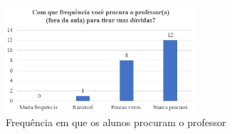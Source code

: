 \begin{figure}[htb]	
\center%
\includegraphics[width=7cm]{./img/frequencia_professor.png}

\caption{Frequência em que os alunos procuram o professor}

\end{figure}

